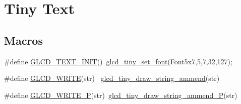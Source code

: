 \hypertarget{group___tiny_text}{}\section{Tiny Text}
\label{group___tiny_text}
\subsection*{Macros}
\begin{DoxyCompactItemize}
\item 
\#define \hyperlink{group___tiny_text_ga9ea14415ac02bc0ddb4cd0fc89084a35}{G\+L\+C\+D\+\_\+\+T\+E\+X\+T\+\_\+\+I\+N\+I\+T}()~\hyperlink{group___tiny_text_ga8df82f7f6d616587f2c5ca55ac9f72fa}{glcd\+\_\+tiny\+\_\+set\+\_\+font}(Font5x7,5,7,32,127);
\item 
\#define \hyperlink{group___tiny_text_ga90afbd21697b61f33dcb1043ce91a164}{G\+L\+C\+D\+\_\+\+W\+R\+I\+T\+E}(str)  ~\hyperlink{group___tiny_text_gafc083b51f666e69c1e40e1b90f80797f}{glcd\+\_\+tiny\+\_\+draw\+\_\+string\+\_\+ammend}(str)
\item 
\#define \hyperlink{group___tiny_text_gab4d98419566ec857011ac6f1d3175437}{G\+L\+C\+D\+\_\+\+W\+R\+I\+T\+E\+\_\+\+P}(str)~\hyperlink{group___tiny_text_ga396ad980cf754dc4db4746d7684e3630}{glcd\+\_\+tiny\+\_\+draw\+\_\+string\+\_\+ammend\+\_\+\+P}(str)
\end{DoxyCompactItemize}
